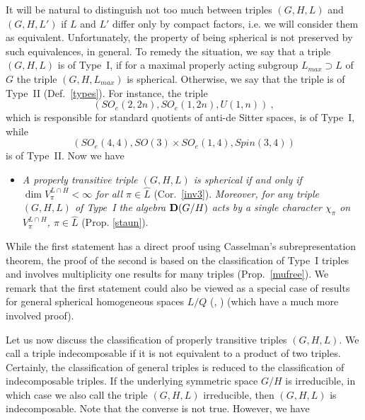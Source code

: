 \documentclass[10]{amsart}
\theoremstyle{remark}
\theoremstyle{definition}
\numberwithin{equation}{section}
\newcommand{\be}{\begin{equation}}
\begin{document}
It will be natural to distinguish not too much between triples $(G,H,L)$ and $(G,H,L')$ if $L$ and $L'$ differ only  by compact factors, i.e. we will
consider them as equivalent. Unfortunately, the property of being spherical is not preserved by such equivalences, in general. To remedy the situation, we say that a triple $(G,H,L)$
is of Type~I, if for a maximal properly acting subgroup $L_{max}\supset L$ of $G$ the triple $(G,H,L_{max})$ is spherical. Otherwise, we say that the triple is of Type~II (Def.~\ref{types}). 
For instance, the triple 
\be\label{T1}
(SO_e(2,2n), SO_e(1,2n),U(1,n))\ , 
\end{equation}
which is responsible for standard quotients of anti-de Sitter spaces, is of Type~I, while 
\be\label{T9}
(SO_e(4,4), SO(3)\times SO_e(1,4), Spin(3,4))
\end{equation} 
is of Type~II. Now we have
\begin{itemize}
\item[({\bf B})] {\em A properly transitive triple $(G,H,L)$ is spherical if and only if $\dim V_\pi^{L\cap H}<\infty$ for all $\pi\in\widehat L$} (Cor.~\ref{inv3}). {\em Moreover, for any triple 
$(G,H,L)$ of Type~I the algebra ${\bf D}(G/H)$ acts by a single character $\chi_\pi$ on  $V_\pi^{L\cap H}$, $\pi\in \widehat L$} (Prop. \ref{staun}).
\end{itemize}
While the first statement has a direct proof using Casselman's subrepresentation theorem, the proof of the second is based on the classification of Type~I triples and involves multiplicity one results for many triples (Prop.~\ref{mufree}).
We remark that the first statement could also be viewed as a special case of results for general spherical homogeneous spaces $L/Q$ (\cite{KO13}, \cite{KS16}) (which have a much more involved proof).

Let us now discuss the classification of properly transitive triples $(G,H,L)$. We call a triple indecomposable if it is not equivalent to a product of two triples. 
Certainly, the classification of general triples is reduced to the classification of indecomposable triples. If the underlying symmetric space $G/H$ is irreducible, in which case we also call the triple
$(G,H,L)$ irreducible, then $(G,H,L)$ is indecomposable. Note that the converse is not true. However, we have
\end{document}
